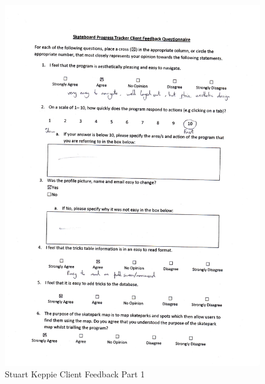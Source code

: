 \begin{figure}[H]
    \includegraphics[width=\textwidth]{./Evaluation/images/StuFeedback1.pdf}
    \caption{Stuart Keppie Client Feedback Part 1} \label{fig:StuFeedback1}
\end{figure}

